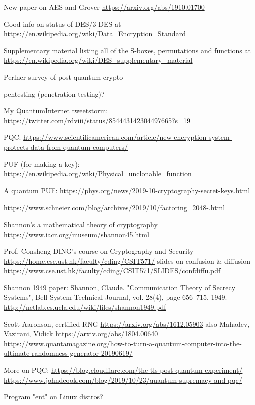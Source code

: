 \documentclass[%
 aip,
 jmp,%
 amsmath,amssymb,
 reprint,%
]{revtex4-1}
\begin{document}
New paper on AES and Grover
\url{https://arxiv.org/abs/1910.01700}

Good info on status of DES/3-DES at
\url{https://en.wikipedia.org/wiki/Data_Encryption_Standard}

Supplementary material listing all of the S-boxes, permutations and
functions at
\url{https://en.wikipedia.org/wiki/DES_supplementary_material}

Perlner survey of post-quantum crypto

pentesting (penetration testing)?

My QuantumInternet tweetstorm:
\url{https://twitter.com/rdviii/status/854443142304497665?s=19}

PQC:
\url{https://www.scientificamerican.com/article/new-encryption-system-protects-data-from-quantum-computers/}

PUF (for making a key):
\url{https://en.wikipedia.org/wiki/Physical_unclonable_function}

A quantum PUF:
\url{https://phys.org/news/2019-10-cryptography-secret-keys.html}

\url{https://www.schneier.com/blog/archives/2019/10/factoring_2048-.html}

Shannon's a mathematical theory of cryptography
\url{https://www.iacr.org/museum/shannon45.html}

Prof. Consheng DING's course on Cryptography and Security
\url{https://home.cse.ust.hk/faculty/cding/CSIT571/}
slides on confusion \& diffusion
\url{https://www.cse.ust.hk/faculty/cding/CSIT571/SLIDES/confdiffu.pdf}

Shannon 1949 paper:
Shannon, Claude. "Communication Theory of Secrecy Systems", Bell System Technical Journal, vol. 28(4), page 656–715, 1949.
\url{http://netlab.cs.ucla.edu/wiki/files/shannon1949.pdf}

Scott Aaronson, certified RNG
\url{https://arxiv.org/abs/1612.05903}
also Mahadev, Vazirani, Vidick
\url{https://arxiv.org/abs/1804.00640}
\url{https://www.quantamagazine.org/how-to-turn-a-quantum-computer-into-the-ultimate-randomness-generator-20190619/}


More on PQC:
\url{https://blog.cloudflare.com/the-tls-post-quantum-experiment/}
\url{https://www.johndcook.com/blog/2019/10/23/quantum-supremacy-and-pqc/}

Program "ent" on Linux distros?
\end{document}
